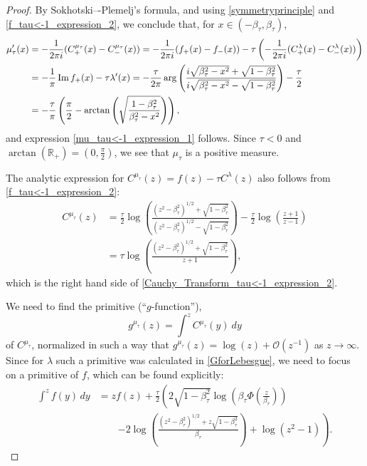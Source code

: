 \documentclass[reqno,11pt]{amsart}
\theoremstyle{plain}
\theoremstyle{definition}
\theoremstyle{remark}
\numberwithin{equation}{section}
\renewcommand{\Im}{\mathop{\rm Im}}
\begin{document}
\begin{proof}
 By Sokhotski–-Plemelj's formula, and using \eqref{symmetryprinciple} and \eqref{f_tau<-1_expression_2}, we conclude that, for \newline$x\in (-\beta_\tau,\beta_\tau)$, 
    \begin{align*}
        \mu_\tau'(x)&=-\frac{1}{2\pi i}(C_+^{\mu_\tau}(x)-C_-^{\mu_\tau}(x))=-\frac{1}{2\pi i}(f_+(x)-f_-(x))-\tau\left(-\frac{1}{2\pi i}(C_+^\lambda(x)-C_-^\lambda(x))\right)\\
        &=-\frac{1}{\pi } \Im f_+(x)-\tau\lambda'(x) = -\frac{\tau}{2\pi }\arg\left(  \frac{i \sqrt{\beta_\tau^2-x^2} + \sqrt{1-\beta_\tau^2}}{i \sqrt{\beta_\tau^2-x^2}- \sqrt{1-\beta_\tau^2}}\right) -\frac{\tau}{2}\\
        &=-\frac{\tau}{\pi}\left(\frac{\pi}{2}-\arctan\left(\sqrt{\frac{1-\beta_\tau^2}{\beta_\tau^2-x^2}}\right)\right),
    \end{align*}
    and expression \eqref{mu_tau<-1_expression_1} follows. Since $\tau<0$ and $\arctan(\mathbb{R}_+)=(0,\frac{\pi}{2})$, we see that $\mu_\tau$ is a positive measure. 

    The analytic expression for $C^{\mu_\tau}(z)=f(z)-\tau C^\lambda(z)$ also follows from \eqref{f_tau<-1_expression_2}:
\begin{align*}
        C^{\mu_\tau}(z)&=\frac{\tau}{2}\log\left(  \frac{(z^2-\beta_\tau^2)^{1/2}+ \sqrt{1-\beta_\tau^2}}{(z^2-\beta_\tau^2)^{1/2}- \sqrt{1-\beta_\tau^2}}\right)-\frac{\tau}{2}\log\left(\frac{z+1}{z-1}\right) \\
    & = \tau\log\left(\frac{(z^2-\beta_\tau^2)^{1/2}+\sqrt{1-\beta_\tau^2}}{z+1}\right),
\end{align*}
which is the right hand side of \eqref{Cauchy_Transform_tau<-1_expression_2}.

We need to find the primitive (``$g$-function''),
$$
g^{\mu_\tau}(z)=\int^z C^{\mu_\tau}(y)\ dy
$$
of $C^{\mu_\tau}$, normalized in such a way that $g^{\mu_\tau}(z)=\log(z)+\mathcal{O}(z^{-1})$ as $z\to\infty$. Since for $\lambda$ such a primitive was calculated in \eqref{GforLebesgue}, we need to focus on a primitive of $f$, which can be found explicitly:
\begin{align*}
\int^z f(y)\, dy &=     z f(z)+ \frac{\tau}{2} \left( 2 \sqrt{1-\beta_\tau ^2} \log \left(\beta_\tau\Phi\left(\frac{z}{\beta_\tau}\right)\right)\right.
    \\
   & \quad\quad \left. -2\log
   \left(\frac{(z^2-\beta_\tau^2)^{1/2}+z\sqrt{1-\beta_\tau^2}}{ 
   \beta_\tau}\right)+\log
   \left(z^2-1\right)  \right).
\end{align*}


\end{proof}
\end{document}
